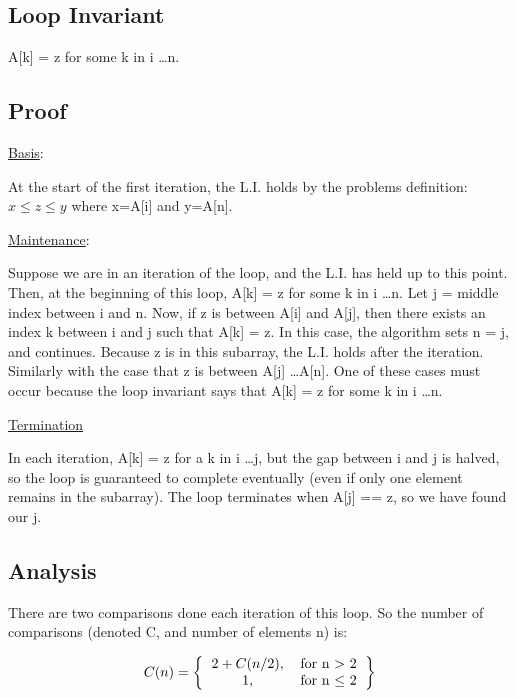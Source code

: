 \documentclass[a4paper,12pt]{article}
\begin{document}
\subsection*{Loop Invariant}
A[k] = z for some k in i \dots n.

\subsection*{Proof}

\underline{Basis}:

\begin{indentpar}{1cm}
  At the start of the first iteration, the L.I. holds by the problems definition: \( x \le z \le y \)
  where x=A[i] and y=A[n]. 
\end{indentpar}

\noindent \underline{Maintenance}:

\begin{indentpar}{1cm}
  Suppose we are in an iteration of the loop, and the L.I. has held up to this point. Then, at the beginning of
  this loop, A[k] = z for some k in i \dots n. Let j = middle index between i and n. Now, if z is 
  between A[i] and A[j], then there exists an index k between i and j such that A[k] = z. In this case, the
  algorithm sets n = j, and continues. Because z is in this subarray, the L.I. holds after the iteration. Similarly
  with the case that z is between A[j] \dots A[n]. One of these cases must occur because the loop invariant says
  that A[k] = z for some k in i \dots n.
\end{indentpar}

\noindent \underline{Termination}

\begin{indentpar}{1cm}
    In each iteration, A[k] = z for a k in i \dots j, but the gap between i and j is halved, so the loop is 
    guaranteed to complete eventually (even if only one element remains in the subarray). The loop terminates
    when A[j] == z, so we have found our j.
\end{indentpar}

\subsection*{Analysis}

There are two comparisons done each iteration of this loop. So the number of
comparisons (denoted C, and number of elements n) is:

\[C(n) = \left\{
\begin{tabular}{c c}
    \( 2 + C(n/2) \),& for n \(>\) 2 \\
    1,& for n \(\le\) 2\\
\end{tabular}
\right\}\]\\
\end{document}
